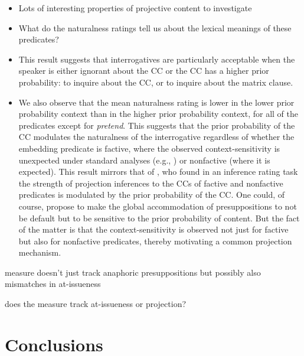 \documentclass[11pt,fleqn]{article}
\newcommand{\6}{\mbox{$[\hspace*{-.6mm}[$}}
\newcommand{\9}{\mbox{$]\hspace*{-.6mm}]$}}
\begin{document}
\begin{itemize}

\item Lots of interesting properties of projective content to investigate

\item What do the naturalness ratings tell us about the lexical meanings of these predicates?


\item This result suggests that interrogatives are particularly acceptable when the speaker is either ignorant about the CC or the CC has a higher prior probability: to inquire about the CC, or to inquire about the matrix clause. 

\item We also observe that the mean naturalness rating is lower in the lower prior probability context than in the higher prior probability context, for all of the predicates except for {\em pretend}. This suggests that the prior probability of the CC modulates the naturalness of the interrogative regardless of whether the embedding predicate is factive, where the observed context-sensitivity is unexpected under standard analyses (e.g., \citealt{heim83,vds92}) or nonfactive (where it is expected). This result mirrors that of \citealt{degen-tonhauser-openmind}, who found in an inference rating task the strength of projection inferences to the CCs of factive and nonfactive predicates is modulated by the prior probability of the CC. One could, of course, propose to make the global accommodation of presuppositions to not be default but to be sensitive to the prior probability of content. But the fact of the matter is that the context-sensitivity is observed not just for factive but also for nonfactive predicates, thereby motivating a common projection mechanism.

\end{itemize}

measure doesn't just track anaphoric presuppositions but possibly also mismatches in at-issueness

does the measure track at-issueness or projection?

\section{Conclusions}\label{s4}




\end{document}
